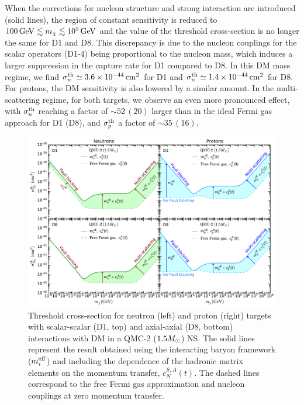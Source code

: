 When the corrections for nucleon structure and strong interaction are introduced (solid lines), the region of constant sensitivity is reduced to $100{\rm \,GeV}\lesssim m_\chi\lesssim  10^5{\rm \,GeV}$ and the value of the threshold cross-section is no longer the same for D1 and D8. This discrepancy is due to the nucleon couplings for the scalar operators (D1-4) being proportional to the nucleon mass, which induces a larger suppression in the capture rate for D1 compared to D8. In this DM mass regime, we find $\sigma^\mathrm{th}_n\simeq3.6\times10^{-44}{\rm \,cm}^2$ for D1 and $\sigma^\mathrm{th}_n\simeq1.4\times10^{-44}{\rm \,cm}^2$  for D8. For protons, the DM sensitivity is also lowered by a similar amount. In the multi-scattering regime, for both targets, we observe an even more pronounced effect, with $\sigma^\mathrm{th}_n$ reaching a factor of $\sim52 \,(20)$ larger than in the ideal Fermi gas approach for D1 (D8), and $\sigma^\mathrm{th}_p$  a factor of $\sim 35 \,(16)$. 

\begin{figure}[t!bp]
   \centering
\includegraphics[width=\textwidth]{capture_3/sigmath_N_D1_D8.pdf}
\caption{Threshold cross-section for neutron (left) and proton (right) targets with scalar-scalar (D1, top) and axial-axial (D8, bottom) interactions with DM in a QMC-2 ($1.5M_\odot$) NS. 
The solid lines represent the result obtained using the interacting baryon framework ($m_i^{\rm eff}$) and including the dependence of the hadronic matrix elements on the momentum transfer, $c_N^{S,A}(t)$. The dashed lines correspond to the free Fermi gas approximation and nucleon couplings at zero momentum transfer. }
   \label{ch5:fig:sigmathcomp}
\end{figure}


